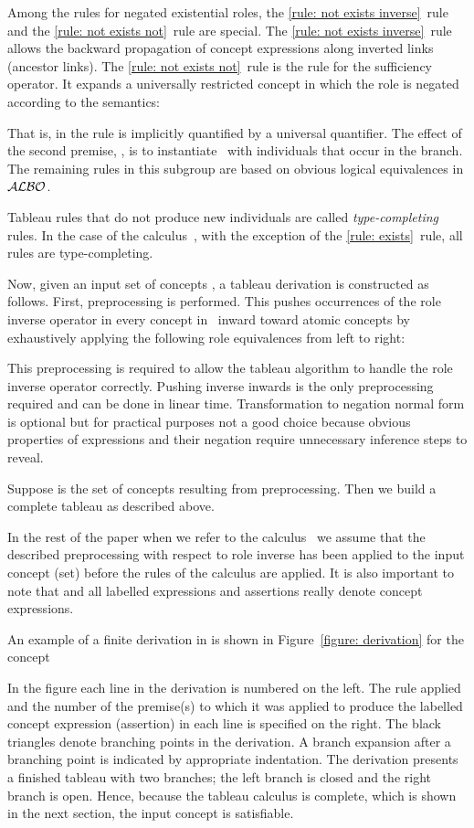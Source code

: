 \documentclass[leqno
,pdflatex
,prodmode
,acmtocl
]{acmsmall}
\newcommand{\mathcmd}[1]{\ensuremath{#1}\xspace}
\newcommand{\dlfont}{\mathcal}
\newcommand{\dl}[1]{\mathcmd{\dlfont{#1}}}
\newcommand{\ALBOid}{\dl{ALBO\smash[t]{\mbox{}}}}
\begin{document}
Among the rules for negated existential roles,
the \eqref{rule: not exists inverse}~rule and
the \eqref{rule: not exists not}~rule
are special.
The \eqref{rule: not exists inverse}~rule
allows the backward propagation of concept expressions
along inverted links (ancestor links).
The \eqref{rule: not exists not}~rule is the rule for the sufficiency
operator.
It expands a universally restricted concept in which the role is
negated according to the semantics: 

That is,  in the rule is implicitly quantified by a universal quantifier.
The effect of the second premise, , is to
instantiate~ with individuals that occur in the branch.
The remaining rules in this subgroup are based on obvious logical
equivalences in \ALBOid.

Tableau rules that do not produce new individuals
are called \emph{type-completing} rules.
In the case of the calculus~, with the exception of
the \eqref{rule: exists}~rule, all rules are type-completing.

Now, given an input set of concepts , a tableau derivation is constructed
as follows.
First, preprocessing is performed. This pushes
occurrences of the role inverse operator in every concept in~
inward toward atomic concepts by exhaustively
applying the following role equivalences from left to right:

This preprocessing is required to allow the tableau algorithm to
handle the role inverse operator correctly. Pushing inverse inwards is the only
preprocessing required and can be done in linear time.
Transformation to negation normal form is optional
but for practical
purposes not a good choice because obvious properties of expressions and
their negation require unnecessary inference steps to reveal.

Suppose  is the set of concepts resulting from
preprocessing.
Then we build a complete tableau   
as described above.

In the rest of the paper when we refer to the calculus~ we assume that
the described preprocessing with respect to role inverse has been
applied to the input concept (set) before the
rules of the calculus are applied.
It is also important to note that  and all labelled
expressions and assertions really denote concept expressions.

An example of a finite derivation in  is shown in Figure~\ref{figure: derivation} for the concept

In the figure each line in the derivation is numbered on the left.
The rule applied and the number of the premise(s) to which it was
applied to produce the labelled concept expression (assertion) in each
line is specified on the right.
The black triangles denote branching points in the derivation.
A branch expansion after a branching point is indicated
by appropriate indentation.
The derivation presents a finished tableau with two branches; the
left branch is closed and the right branch is open.
Hence, because the tableau calculus is complete, which is shown in
the next section, the input concept  is satisfiable.
\end{document}
